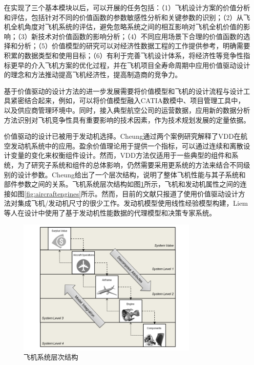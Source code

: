 \documentclass[12pt,a4paper]{report}
\begin{document}
在实现了三个基本模块以后，可以开展的任务包括：（1）飞机设计方案的价值分析和评估，包括针对不同的价值函数的参数敏感性分析和关键参数的识别；（2）从飞机全机角度对飞机系统的评估，避免忽略系统之间的相互影响对飞机全机价值的影响；（3）新技术对价值函数的影响分析；（4）不同应用场景下合理的价值函数的选择和分析；（5）价值模型的研究可以对经济性数据工程的工作提供参考，明确需要积累的数据类型和使用目标；（6）有利于完善飞机设计体系，将经济性等竞争性指标更早的介入飞机方案的优化过程，并在飞机项目全寿命周期中应用价值驱动设计的理念和方法推动提高飞机经济性，提高制造商的竞争力。

基于价值驱动的设计方法的进一步发展需要将价值模型和飞机的设计流程与设计工具紧密结合起来，例如，可以将价值模型融入CATIA数模中、项目管理工具中，以及供应商管理环境中。同时，接入典型航空公司的运营数据，应用新的数据分析方法识别对飞机竞争性具有重要影响的技术因素，作为技术规划发展的定量依据。

价值驱动的设计已被用于发动机选择。Cheung\cite{627cheung2012application}通过两个案例研究解释了VDD在航空发动机系统中的应用。盈余价值理论用于提供一个指标，可以通过连续和离散设计变量的变化来权衡组件设计。然而，VDD方法仅适用于一些典型的组件和系统，为了研究子系统和组件的总体影响，仍然需要采用更系统的方法来结合不同级别的设计参数。Cheung给出了一个层次结构，说明了整体飞机性能与其子系统和部件参数之间的关系。飞机系统层次结构如图\ref{fig:aircraftsubsystems}所示，飞机和发动机属性之间的连接如图\ref{fig:aircraftengines}所示。然而，目前的文献只报道了使用价值驱动设计方法对集成飞机/发动机尺寸的很少工作。发动机模型使用线性经验模型构建，Liem\cite{liem2015surrogate}等人在设计中使用了基于发动机性能数据的代理模型和决策专家系统。

\begin{figure}[ht!]
	\centering
		\includegraphics[width=0.8\textwidth]{./eps/aircraft-subsystem-chain.png}
		\caption{飞机系统层次结构}
		\label{fig:aircraftsubsystems}
\end{figure}
\end{document}
